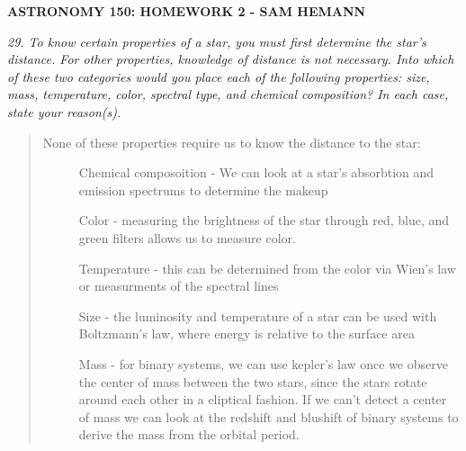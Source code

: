 \documentclass[letterpaper,10pt]{article}
\begin{document}
\begin{center}
    \bf
        ASTRONOMY 150: HOMEWORK 2 - SAM HEMANN
\end{center}



\par
\it
29. To know certain properties of a star, you must first determine
the star's distance. For other properties, knowledge of
distance is not necessary. Into which of these two categories
would you place each of the following properties: size, mass,
temperature, color, spectral type, and chemical composition?
In each case, state your reason(s).
\normalfont

\begin{quote}
None of these properties require us to know the distance to the
star:
\begin{description}
    \item[]
    Chemical composoition - We can look at a star's absorbtion
    and emission spectrums to determine the makeup
    \item[]
    Color - measuring the brightness of the star through red,
    blue, and green filters allows us to measure color.
    \item[]
    Temperature - this can be determined from the color via
    Wien's law or measurments of the spectral lines
    \item[]
    Size - the luminosity and temperature of a star can be used
    with Boltzmann's law, where energy is relative to the surface area
    \item[]
    Mass - for binary systems, we can use kepler's law once we
    observe the center of mass between the two stars, since the stars
    rotate around each other in a eliptical fashion. If we can't
    detect a center of mass we can look at the redshift and blushift
    of binary systems to derive the mass from the orbital period.
\end{description}
\end{quote}
\end{document}
